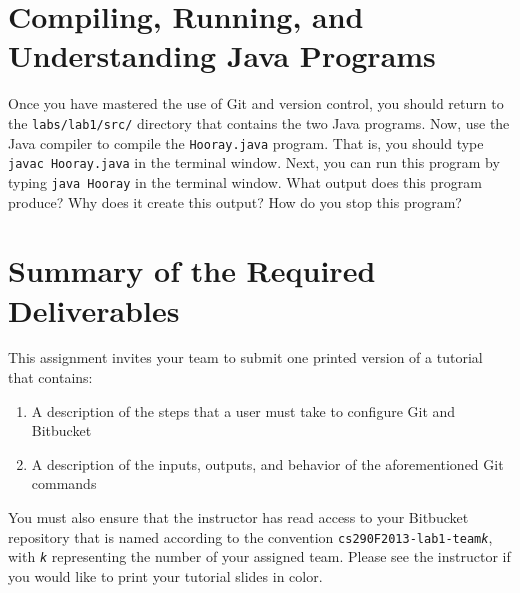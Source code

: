 \section*{Compiling, Running, and Understanding Java Programs}

  Once you have mastered the use of Git and version control, you should return to the {\tt labs/lab1/src/} directory that
  contains the two Java programs. Now, use the Java compiler to compile the {\tt Hooray.java} program.  That is, you
  should type {\tt javac Hooray.java} in the terminal window.  Next, you can run this program by typing {\tt java
  Hooray} in the terminal window.  What output does this program produce?  Why does it create this output? How do you
  stop this program? 

\section*{Summary of the Required Deliverables}

  This assignment invites your team to submit one printed version of a tutorial that contains:

\begin{enumerate}
	
	\item A description of the steps that a user must take to configure Git and Bitbucket

	\item A description of the inputs, outputs, and behavior of the aforementioned Git commands

\end{enumerate}

You must also ensure that the instructor has read access to your Bitbucket repository that is named according to the
convention {\tt cs290F2013-lab1-team{\em k}}, with {\tt {\em k}} representing the number of your assigned team. Please
see the instructor if you would like to print your tutorial slides in color.


